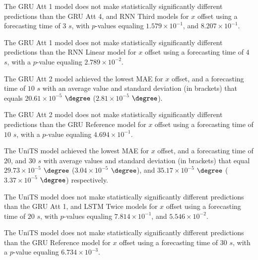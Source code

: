 
The GRU Att 1 model does not make statistically significantly different predictions than the GRU Att 4, and RNN Third models for $x$ offset using a forecasting time of $3$ $s$, with $p$-values equaling $1.579 \times 10^{-1}$, and $8.207 \times 10^{-1}$.

The GRU Att 1 model does not make statistically significantly different predictions than the RNN Linear model for $x$ offset using a forecasting time of $4$ $s$, with a $p$-value equaling $2.789 \times 10^{-2}$.


The GRU Att 2 model achieved the lowest MAE for $x$ offset, and a forecasting time of $10$ $s$ with an average value and standard deviation (in brackets) that equals $20.61 \times 10^{-5}$ $\degree$ ($2.81 \times 10^{-5}$ $\degree$).

The GRU Att 2 model does not make statistically significantly different predictions than the GRU Reference model for $x$ offset using a forecasting time of $10$ $s$, with a $p$-value equaling $4.694 \times 10^{-1}$.

The UniTS model achieved the lowest MAE for $x$ offset, and a forecasting time of $20$, and $30$ $s$ with average values and standard deviation (in brackets) that equal $29.73 \times 10^{-5}$ $\degree$ ($3.04 \times 10^{-5}$ $\degree$), and $35.17 \times 10^{-5}$ $\degree$ ($3.37 \times 10^{-5}$ $\degree$) respectively.

The UniTS model does not make statistically significantly different predictions than the GRU Att 1, and LSTM Twice models for $x$ offset using a forecasting time of $20$ $s$, with $p$-values equaling $7.814 \times 10^{-1}$, and $5.546 \times 10^{-2}$.

The UniTS model does not make statistically significantly different predictions than the GRU Reference model for $x$ offset using a forecasting time of $30$ $s$, with a $p$-value equaling $6.734 \times 10^{-3}$.

